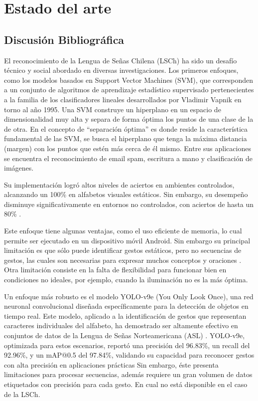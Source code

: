 \documentclass{article}
\begin{document}
\section{Estado del arte}

\subsection{Discusión Bibliográfica}

El reconocimiento de la Lengua de Señas Chilena (LSCh) ha sido un desafío técnico y social abordado en diversas investigaciones. Los primeros enfoques, como los modelos basados en Support Vector Machines (SVM), que corresponden a un conjunto de algoritmos de aprendizaje estadístico supervisado pertenecientes a la familia de los clasificadores lineales desarrollados por Vladimir Vapnik en torno al año 1995. Una SVM construye un hiperplano en un espacio de dimensionalidad muy alta y separa de forma óptima los puntos de una clase de la de otra. En el concepto de “separación óptima” es donde reside la característica fundamental de las SVM, se busca el hiperplano que tenga la máxima distancia (margen) con los puntos que estén más cerca de él mismo. Entre sus aplicaciones se encuentra el reconocimiento de email spam, escritura a mano y clasificación de imágenes.

Su implementación logró altos niveles de aciertos en ambientes controlados, alcanzando un 100\% en alfabetos visuales estáticos. Sin embargo, su desempeño disminuye significativamente en entornos no controlados, con aciertos de hasta un 80\% \cite{cita3}.

Este enfoque tiene algunas ventajas, como el uso eficiente de memoria, lo cual permite ser ejecutado en un dispositivo móvil Android. Sin embargo su principal limitación es que sólo puede identificar gestos estáticos, pero no secuencias de gestos, las cuales son necesarias para expresar muchos conceptos y oraciones \cite{cita4}. Otra limitación consiste en la falta de flexibilidad para funcionar bien en condiciones no ideales, por ejemplo, cuando la iluminación no es la más óptima.

Un enfoque más robusto es el modelo YOLO-v9e (You Only Look Once), una red neuronal convolucional diseñada específicamente para la detección de objetos en tiempo real. Este modelo, aplicado a la identificación de gestos que representan caracteres individuales del alfabeto, ha demostrado ser altamente efectivo  en conjuntos de datos de la Lengua de Señas Norteamericana (ASL) \cite{cita5}. YOLO-v9e, optimizada para estos escenarios, reportó una precisión del 96.83\%, un recall del 92.96\%, y un mAP@0.5 del 97.84\%, validando su capacidad para reconocer gestos con alta precisión en aplicaciones prácticas \cite{cita11} Sin embargo, éste presenta limitaciones para procesar secuencias, además requiere un gran volumen de datos etiquetados con precisión para cada gesto. En cual no está disponible en el caso de la LSCh. 
\end{document}
